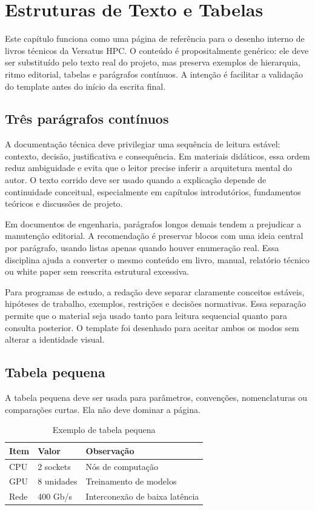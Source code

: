 \chapter{Estruturas de Texto e Tabelas}

Este capítulo funciona como uma página de referência para o desenho interno de livros técnicos da Versatus HPC. O conteúdo é propositalmente genérico: ele deve ser substituído pelo texto real do projeto, mas preserva exemplos de hierarquia, ritmo editorial, tabelas e parágrafos contínuos. A intenção é facilitar a validação do template antes do início da escrita final.

\section{Três parágrafos contínuos}

A documentação técnica deve privilegiar uma sequência de leitura estável: contexto, decisão, justificativa e consequência. Em materiais didáticos, essa ordem reduz ambiguidade e evita que o leitor precise inferir a arquitetura mental do autor. O texto corrido deve ser usado quando a explicação depende de continuidade conceitual, especialmente em capítulos introdutórios, fundamentos teóricos e discussões de projeto.

Em documentos de engenharia, parágrafos longos demais tendem a prejudicar a manutenção editorial. A recomendação é preservar blocos com uma ideia central por parágrafo, usando listas apenas quando houver enumeração real. Essa disciplina ajuda a converter o mesmo conteúdo em livro, manual, relatório técnico ou white paper sem reescrita estrutural excessiva.

Para programas de estudo, a redação deve separar claramente conceitos estáveis, hipóteses de trabalho, exemplos, restrições e decisões normativas. Essa separação permite que o material seja usado tanto para leitura sequencial quanto para consulta posterior. O template foi desenhado para aceitar ambos os modos sem alterar a identidade visual.

\section{Tabela pequena}

A tabela pequena deve ser usada para parâmetros, convenções, nomenclaturas ou comparações curtas. Ela não deve dominar a página.

\begin{table}[htbp]
\centering
\caption{Exemplo de tabela pequena}
\label{tab:pequena}
\begin{tabular}{lll}
\toprule
Item & Valor & Observação \\
\midrule
CPU & 2 sockets & Nós de computação \\
GPU & 8 unidades & Treinamento de modelos \\
Rede & 400 Gb/s & Interconexão de baixa latência \\
\bottomrule
\end{tabular}
\end{table}

